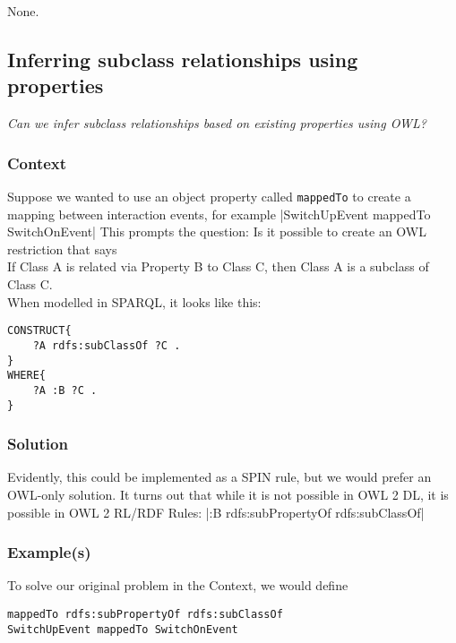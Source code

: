 None.
 




\subsection{Inferring subclass relationships using properties}

\emph{Can we infer subclass relationships based on existing properties using OWL?}

\subsubsection{Context}
Suppose we wanted to use an object property called \texttt{mappedTo} to create a mapping between interaction events, for example |SwitchUpEvent mappedTo SwitchOnEvent| This prompts the question: Is it possible to create an \ac{OWL} restriction that says\\

\noindent
If Class A is related via Property B to Class C, then Class A is a subclass of Class C.\\ 

When modelled in \ac{SPARQL}, it looks like this:

\begin{verbatim}
CONSTRUCT{
	?A rdfs:subClassOf ?C .
}
WHERE{
	?A :B ?C .
}
\end{verbatim}

\subsubsection{Solution}

Evidently, this could be implemented as a \ac{SPIN} rule, but we would prefer an \ac{OWL}-only solution. It turns out that while it is not possible in \ac{OWL} 2 DL, it is possible in \ac{OWL} 2 RL/RDF Rules: |:B rdfs:subPropertyOf rdfs:subClassOf|

\subsubsection{Example(s)}

To solve our original problem in the Context, we would define 

\begin{verbatim}
mappedTo rdfs:subPropertyOf rdfs:subClassOf
SwitchUpEvent mappedTo SwitchOnEvent
\end{verbatim}

